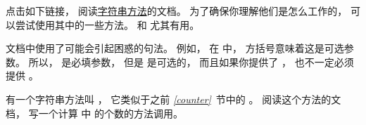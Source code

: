\begin{exercise}
  


点击如下链接， 阅读\href{http://docs.python.org/3/library/stdtypes.html#string-methods}{字符串方法}的文档。   为了确保你理解他们是怎么工作的， 可以尝试使用其中的一些方法。  {\em {}} 和 {\em {}} 尤其有用。


文档中使用了可能会引起困惑的句法。  例如， 在 {\em {}} 中， 方括号意味着这是可选参数。  所以， {\em {}} 是必填参数， 但是 {\em {}} 是可选的， 而且如果你提供了 {\em {}} ， 也不一定必须提供 {\em {}} 。

  

\end{exercise}


\begin{exercise}
  


有一个字符串方法叫 {\em {}} ， 它类似于之前 {\em \ref{counter}}~节中的 {\em {}} 。  阅读这个方法的文档， 写一个计算 {\em {}} 中 {\em {}} 的个数的方法调用。


\end{exercise}


